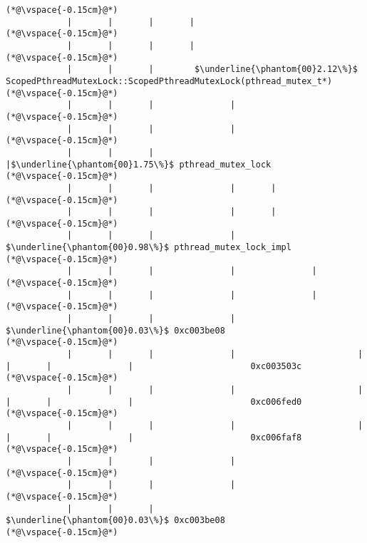 \begin{lstlisting}[caption=Unicode-merkkijonon osoitinoperaatio, label=profile:C2JReadUnicode-512, numberbychapter=true, frame=lines, float, floatplacement=t]
(*@\vspace{-0.15cm}@*)
            |       |       |       |
(*@\vspace{-0.15cm}@*)
            |       |       |       |
(*@\vspace{-0.15cm}@*)
            |       |       |        $\underline{\phantom{00}2.12\%}$ ScopedPthreadMutexLock::ScopedPthreadMutexLock(pthread_mutex_t*)
(*@\vspace{-0.15cm}@*)
            |       |       |               |
(*@\vspace{-0.15cm}@*)
            |       |       |               |
(*@\vspace{-0.15cm}@*)
            |       |       |               |$\underline{\phantom{00}1.75\%}$ pthread_mutex_lock
(*@\vspace{-0.15cm}@*)
            |       |       |               |       |
(*@\vspace{-0.15cm}@*)
            |       |       |               |       |
(*@\vspace{-0.15cm}@*)
            |       |       |               |        $\underline{\phantom{00}0.98\%}$ pthread_mutex_lock_impl
(*@\vspace{-0.15cm}@*)
            |       |       |               |               |
(*@\vspace{-0.15cm}@*)
            |       |       |               |               |
(*@\vspace{-0.15cm}@*)
            |       |       |               |                $\underline{\phantom{00}0.03\%}$ 0xc003be08
(*@\vspace{-0.15cm}@*)
            |       |       |               |                        |       |       |               |                       0xc003503c
(*@\vspace{-0.15cm}@*)
            |       |       |               |                        |       |       |               |                       0xc006fed0
(*@\vspace{-0.15cm}@*)
            |       |       |               |                        |       |       |               |                       0xc006faf8
(*@\vspace{-0.15cm}@*)
            |       |       |               |
(*@\vspace{-0.15cm}@*)
            |       |       |               |
(*@\vspace{-0.15cm}@*)
            |       |       |                $\underline{\phantom{00}0.03\%}$ 0xc003be08
(*@\vspace{-0.15cm}@*)

\end{lstlisting}
